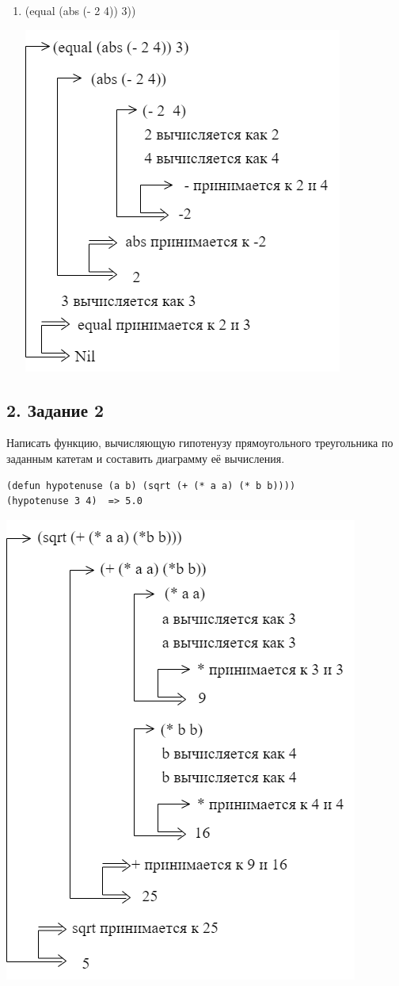 \begin{enumerate}
	\item (equal (abs (- 2 4)) 3))

	\includegraphics[scale=1.0]{img/1.6}	
\end{enumerate}
\newpage
\subsection*{2. Задание 2}
Написать функцию, вычисляющую гипотенузу прямоугольного
треугольника по заданным катетам и составить диаграмму её вычисления.

\begin{lstlisting}
(defun hypotenuse (a b) (sqrt (+ (* a a) (* b b))))
(hypotenuse 3 4)  => 5.0
\end{lstlisting}

\includegraphics[scale=1.0]{img/2}	
\newpage
